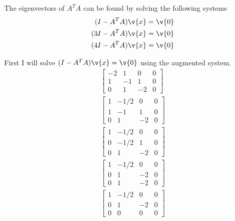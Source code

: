 \documentclass[11pt]{article}
\begin{document}
\begin{enumerate}
\begin{enumerate}
                The eigenvectors of $A^T A$ can be found by solving the following systems
                \begin{align*}
                    (I - A^T A)\v{x} &= \v{0} \\
                    (3I - A^T A)\v{x} &= \v{0} \\
                    (4I - A^T A)\v{x} &= \v{0} \\
                \end{align*}

                First I will solve $(I - A^T A)\v{x} = \v{0}$ using the
                augmented system.
                \begin{align*}
                    \begin{bmatrix}
                        -2 &  1 &  0 & 0 \\
                         1 & -1 &  1 & 0 \\
                         0 &  1 & -2 & 0
                    \end{bmatrix} \\
                    \begin{bmatrix}
                         1 & -1/2 &  0 & 0 \\
                         1 & -1 &  1 & 0 \\
                         0 &  1 & -2 & 0
                    \end{bmatrix} \\
                    \begin{bmatrix}
                         1 & -1/2 &  0 & 0 \\
                         0 & -1/2 &  1 & 0 \\
                         0 &  1 & -2 & 0
                    \end{bmatrix} \\
                    \begin{bmatrix}
                         1 & -1/2 & 0 & 0 \\
                         0 & 1 & -2 & 0 \\
                         0 & 1 & -2 & 0
                    \end{bmatrix} \\
                    \begin{bmatrix}
                         1 & -1/2 &  0 & 0 \\
                         0 & 1 & -2 & 0 \\
                         0 & 0 & 0 & 0

\end{bmatrix}
\end{align*}
\end{enumerate}
\end{enumerate}
\end{document}
